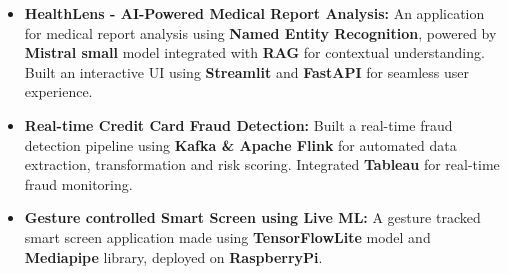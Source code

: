 \documentclass[letterpaper,10pt]{article}
\begin{document}
\begin{itemize}[itemsep=0pt,topsep=2pt]

     \item \textbf{HealthLens - AI-Powered Medical Report Analysis:} An application for medical report analysis using \textbf{Named Entity Recognition}, powered by \textbf{Mistral small} model integrated with \textbf{RAG} for contextual understanding. Built an interactive UI using \textbf{Streamlit} and \textbf{FastAPI} for seamless user experience.

     \item \textbf{Real-time Credit Card Fraud Detection:} Built a real-time fraud detection pipeline using \textbf{Kafka \& Apache Flink} for automated data extraction, transformation and risk scoring. Integrated \textbf{Tableau} for real-time fraud monitoring.


  \item \textbf{Gesture controlled Smart Screen using Live ML:} A gesture tracked smart screen application made using \textbf{TensorFlowLite} model and \textbf{Mediapipe} library, deployed on \textbf{RaspberryPi}.


  

  




   
 
\end{itemize}
\vspace{-12pt}
\end{document}
